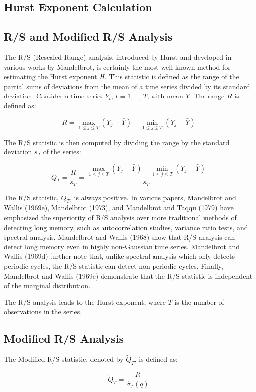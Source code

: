 \documentclass[11pt]{extarticle}
\begin{document}
\subsection{Hurst Exponent Calculation}
\subsection{R/S and Modified R/S Analysis}
The R/S (Rescaled Range) analysis, introduced by Hurst and developed in various works by Mandelbrot, is certainly the most well-known method for estimating the Hurst exponent $H$. This statistic is defined as the range of the partial sums of deviations from the mean of a time series divided by its standard deviation. Consider a time series $Y_t$, $t = 1, ..., T$, with mean $\bar{Y}$. The range $R$ is defined as:

\[
R = \max_{1 \leq j \leq T} \left( Y_j - \bar{Y} \right) - \min_{1 \leq j \leq T} \left( Y_j - \bar{Y} \right)
\]

The R/S statistic is then computed by dividing the range by the standard deviation $s_T$ of the series:

\[
Q_T = \frac{R}{s_T} = \frac{\max_{1 \leq j \leq T} \left( Y_j - \bar{Y} \right) - \min_{1 \leq j \leq T} \left( Y_j - \bar{Y} \right)}{s_T}
\]

The R/S statistic, $Q_T$, is always positive. In various papers, Mandelbrot and Wallis (1969e), Mandelbrot (1973), and Mandelbrot and Taqqu (1979) have emphasized the superiority of R/S analysis over more traditional methods of detecting long memory, such as autocorrelation studies, variance ratio tests, and spectral analysis. Mandelbrot and Wallis (1968) show that R/S analysis can detect long memory even in highly non-Gaussian time series. Mandelbrot and Wallis (1969d) further note that, unlike spectral analysis which only detects periodic cycles, the R/S statistic can detect non-periodic cycles. Finally, Mandelbrot and Wallis (1969e) demonstrate that the R/S statistic is independent of the marginal distribution.

The R/S analysis leads to the Hurst exponent, where $T$ is the number of observations in the series.

\subsection{Modified R/S Analysis}
The Modified R/S statistic, denoted by $\tilde{Q}_T$, is defined as:

\[
\tilde{Q}_T = \frac{R}{\hat{\sigma}_T(q)}
\]
\end{document}
